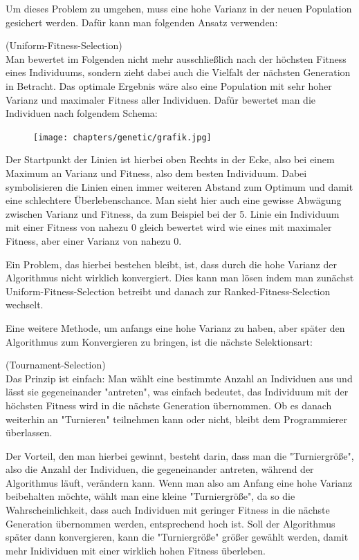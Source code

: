 Um dieses Problem zu umgehen, muss eine hohe Varianz in der neuen Population gesichert werden. Dafür kann man folgenden Ansatz verwenden:
\begin{algo}(Uniform-Fitness-Selection)\\
	Man bewertet im Folgenden nicht mehr ausschließlich nach der höchsten Fitness eines Individuums, sondern zieht dabei auch die Vielfalt der nächsten Generation in Betracht. Das optimale Ergebnis wäre also eine Population mit sehr hoher Varianz und maximaler Fitness aller Individuen. Dafür bewertet man die Individuen nach folgendem Schema:
	\begin{figure}[h]
		\texttt{[image: chapters/genetic/grafik.jpg]}
	\end{figure}
	
	Der Startpunkt der Linien ist hierbei oben Rechts in der Ecke, also bei einem Maximum an Varianz und Fitness, also dem besten Individuum. Dabei symbolisieren die Linien einen immer weiteren Abstand zum Optimum und damit eine schlechtere Überlebenschance. Man sieht hier auch eine gewisse Abwägung zwischen Varianz und Fitness, da zum Beispiel bei der 5. Linie ein Individuum mit einer Fitness von nahezu 0 gleich bewertet wird wie eines mit maximaler Fitness, aber einer Varianz von nahezu 0.
	
	Ein Problem, das hierbei bestehen bleibt, ist, dass durch die hohe Varianz der Algorithmus nicht wirklich konvergiert. Dies kann man lösen indem man zunächst Uniform-Fitness-Selection betreibt und danach zur Ranked-Fitness-Selection wechselt.
\end{algo}
Eine weitere Methode, um anfangs eine hohe Varianz zu haben, aber später den Algorithmus zum Konvergieren zu bringen, ist die nächste Selektionsart:
\begin{algo}(Tournament-Selection)\\
	Das Prinzip ist einfach: Man wählt eine bestimmte Anzahl an Individuen aus und lässt sie gegeneinander "antreten", was einfach bedeutet, das Individuum mit der höchsten Fitness wird in die nächste Generation übernommen. Ob es danach weiterhin an "Turnieren" teilnehmen kann oder nicht, bleibt dem Programmierer überlassen.

	Der Vorteil, den man hierbei gewinnt, besteht darin, dass man die "Turniergröße", also die Anzahl der Individuen, die gegeneinander antreten, während der Algorithmus läuft, verändern kann. Wenn man also am Anfang eine hohe Varianz beibehalten möchte, wählt man eine kleine "Turniergröße", da so die Wahrscheinlichkeit, dass auch Individuen mit geringer Fitness in die nächste Generation übernommen werden, entsprechend hoch ist. Soll der Algorithmus später dann konvergieren, kann die "Turniergröße" größer gewählt werden, damit mehr Inidividuen mit einer wirklich hohen Fitness überleben.
\end{algo}

